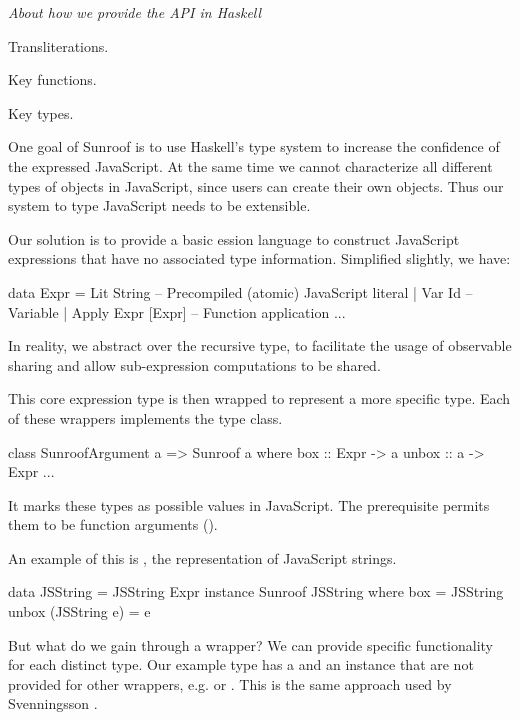 \CURSOR{}

{\em About how we provide the API in Haskell}

Transliterations.

Key functions.

Key types.



One goal of Sunroof is to use Haskell's type system to
increase the confidence of the expressed JavaScript.
At the same time we cannot characterize 
all different types of objects in JavaScript, since 
users can create their own objects. Thus our 
system to type JavaScript needs to be extensible.

Our solution is to provide a basic ession
language to construct JavaScript expressions 
that have no associated type information. Simplified slightly, we have:
\begin{Code}
data Expr 
  = Lit String        -- Precompiled (atomic) JavaScript literal
  | Var Id            -- Variable
  | Apply Expr [Expr] -- Function application
  ...
\end{Code}
In reality, we abstract  over the recursive type,
to facilitate the usage of observable sharing \cite{Gill:09:TypeSafeReification}
and allow sub-expression computations to be shared.

This core expression type 
is then wrapped to represent a more specific type. 
Each of these wrappers implements the  type class.
\begin{Code}
class SunroofArgument a => Sunroof a where
  box   :: Expr -> a
  unbox :: a -> Expr
  ...
\end{Code}
It marks these types as possible values in JavaScript.
The  prerequisite permits them 
to be function arguments ().

An example of this is , the representation
of JavaScript strings.
\begin{Code}
data JSString = JSString Expr
instance Sunroof JSString where
  box                = JSString
  unbox (JSString e) = e
\end{Code}
But what do we gain through a wrapper? We can
provide specific functionality for each distinct type.
Our example type  has a  and an 
 instance that are not provided for other 
wrappers, e.g.  or .
This is the same approach used by
Svenningsson \cite{Svenningsson:12:CombiningEmbedding}.

